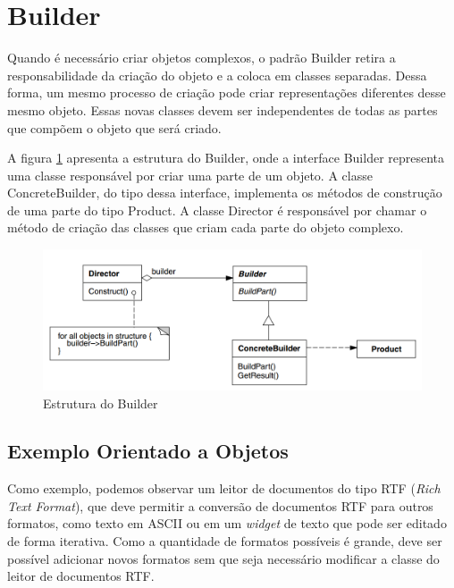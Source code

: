 \section{Builder}

Quando é necessário criar objetos  
complexos, o padrão Builder retira a 
responsabilidade da criação do objeto e 
a coloca em classes separadas. Dessa forma, 
um mesmo processo de criação pode criar 
representações diferentes desse mesmo 
objeto. Essas novas classes devem ser 
independentes de todas as partes que 
compõem o objeto que será criado.

A figura \ref{builder_struct} apresenta 
a estrutura do Builder, onde a interface 
Builder representa uma classe responsável 
por criar uma parte de um objeto. A classe 
ConcreteBuilder, do tipo dessa interface, 
implementa os métodos de construção de 
uma parte do tipo Product. A classe Director 
é responsável por chamar o método de criação 
das classes que criam cada parte do objeto 
complexo.

\begin{figure}[htb]
	\caption{\label{builder_struct}Estrutura do Builder}
	\begin{center}
	    \includegraphics[scale=0.4]{5_padroes-contexto-funcional/5.1_criacionais/5.1.3_builder/diagram.png}
	\end{center}
\end{figure}

\subsection*{Exemplo Orientado a Objetos}

Como exemplo, podemos observar um leitor de 
documentos do tipo RTF (\textit{Rich Text Format}), 
que deve permitir a conversão de documentos RTF 
para outros formatos, como texto em ASCII ou em um 
\textit{widget} de texto que pode ser editado de 
forma iterativa. Como a quantidade de formatos 
possíveis é grande, deve ser possível adicionar 
novos formatos sem que seja necessário modificar 
a classe do leitor de documentos RTF. 

